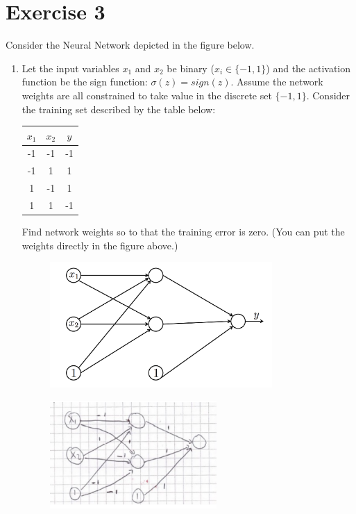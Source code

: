 \documentclass[a4paper,11pt,oneside]{book}
\begin{document}
\section{Exercise 3}
    Consider the Neural Network depicted in the figure below.
    \begin{enumerate}
        \item Let the input variables $x_1$ and $x_2$ be binary ($x_i \in \{-1,1\}$) and the activation function be the sign function: $\sigma(z) = sign(z)$. Assume the network weights are all constrained to take value in the discrete set $\{-1,1\}$. Consider the training set described by the table below:
            \begin{center}
                \begin{tabular}{ccc}
                    $x_1$ & $x_2$ & $y$ \\
                    \hline
                    -1 & -1 & -1 \\
                    -1 & 1 & 1 \\
                    1 & -1 & 1 \\
                    1 & 1 & -1
                \end{tabular}
            \end{center}
            Find network weights so to that the training error is zero. (You can put the weights directly in the figure above.)
                \begin{figure}[H]
                    \centering
                    \includegraphics[width=0.8\textwidth,height=0.7\textheight,keepaspectratio]{images/3_29_Jan_2018.png}
                \end{figure}

                \begin{solution}
                    \begin{figure}[H]
                        \centering
                        \includegraphics[width=0.6\textwidth,height=0.7\textheight,keepaspectratio]{images/1_3_29_Jan_2018.png}
                    \end{figure}
                \end{solution}


\end{enumerate}
\end{document}
